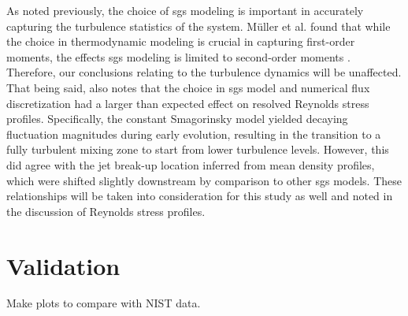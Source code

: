 As noted previously, the choice of \gls{sgs} modeling is important in accurately capturing the turbulence statistics of the system. M\"{u}ller et al. found that while the choice in thermodynamic modeling is crucial in capturing first-order moments, the effects \gls{sgs} modeling is limited to second-order moments \cite{doi:10.1063/1.4937948}. Therefore, our conclusions relating to the turbulence dynamics will be unaffected. That being said, \cite{doi:10.1063/1.4937948} also notes that the choice in \gls{sgs} model and numerical flux discretization had a larger than expected effect on resolved Reynolds stress profiles. Specifically, the constant Smagorinsky model yielded decaying fluctuation magnitudes during early evolution, resulting in the transition to a fully turbulent mixing zone to start from lower turbulence levels. However, this did agree with the jet break-up location inferred from mean density profiles, which were shifted slightly downstream by comparison to other \gls{sgs} models. These relationships will be taken into consideration for this study as well and noted in the discussion of Reynolds stress profiles.



\section{Validation}
Make plots to compare with NIST data.


